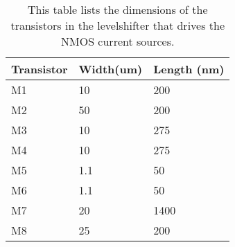 \begin{appendices}
\begin{table}[h!]
\caption{This table lists the dimensions of the transistors in the levelshifter that drives the NMOS current sources.}
\begin{tabular}{l||l|l}\arraybackslash
Transistor & Width(um) & Length (nm) \\\hline\hline
M1 & 10 & 200\\\hline
M2 & 50 & 200\\\hline
M3 & 10 & 275\\\hline
M4 & 10 & 275\\\hline
M5 & 1.1 & 50\\\hline
M6 & 1.1 & 50\\\hline
M7 & 20 & 1400\\\hline
M8 & 25 & 200
\end{tabular}
\label{Tab:Levelshifter_NMOS_sizes}
\end{table}


\end{appendices}
